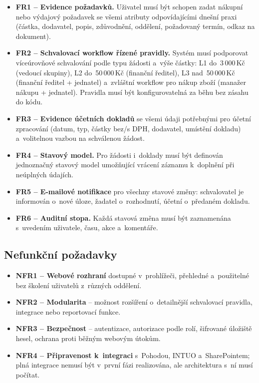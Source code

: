 \begin{itemize}
\item \textbf{FR1 -- Evidence požadavků.} Uživatel musí být schopen
zadat nákupní nebo výdajový požadavek se všemi atributy odpovídajícími
dnešní praxi (částka, dodavatel, popis, zdůvodnění, oddělení,
požadovaný termín, odkaz na dokument).
\item \textbf{FR2 -- Schvalovací workflow řízené pravidly.} Systém musí
podporovat víceúrovňové schvalování podle typu žádosti a~výše částky:
L1 do~3\,000\,Kč (vedoucí skupiny), L2 do~50\,000\,Kč (finanční
ředitel), L3 nad~50\,000\,Kč (finanční ředitel + jednatel) a~zvláštní
workflow pro nákup zboží (manažer nákupu + jednatel). Pravidla musí
být konfigurovatelná za běhu bez zásahu do kódu.
\item \textbf{FR3 -- Evidence účetních dokladů} se všemi údaji
potřebnými pro účetní zpracování (datum, typ, částky bez/s DPH,
dodavatel, umístění dokladu) a~volitelnou vazbou na schválenou žádost.
\item \textbf{FR4 -- Stavový model.} Pro žádosti i~doklady musí být
definován jednoznačný stavový model umožňující vrácení záznamu
k~doplnění při neúplných údajích.
\item \textbf{FR5 -- E-mailové notifikace} pro všechny stavové změny:
schvalovatel je informován o~nové úloze, žadatel o~rozhodnutí,
účetní o~předaném dokladu.
\item \textbf{FR6 -- Auditní stopa.} Každá stavová změna musí být
zaznamenána s~uvedením uživatele, času, akce a~komentáře.
\end{itemize}


\subsection{Nefunkční požadavky}

\begin{itemize}
\item \textbf{NFR1 -- Webové rozhraní} dostupné v~prohlížeči,
přehledné a~použitelné bez školení uživatelů z~různých oddělení.
\item \textbf{NFR2 -- Modularita} -- možnost rozšíření o~detailnější
schvalovací pravidla, integrace nebo reportovací funkce.
\item \textbf{NFR3 -- Bezpečnost} -- autentizace, autorizace podle
rolí, šifrované úložiště hesel, ochrana proti běžným webovým útokům.
\item \textbf{NFR4 -- Připravenost k~integraci} s~Pohodou, INTUO
a~SharePointem; plná integrace nemusí být v~první fázi
realizována, ale architektura s~ní musí počítat.
\end{itemize}


